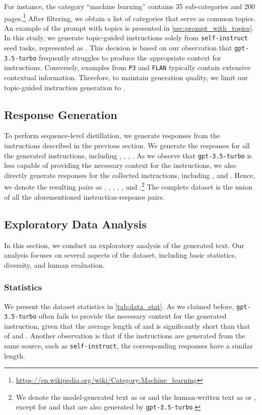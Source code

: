 \documentclass[11pt]{article}
\newcommand{\dataset}[1]{\texttt{#1}\xspace}
\newcommand{\llm}[1]{\texttt{#1}\xspace}
\newcommand{\chatgpt}{\llm{gpt-3.5-turbo}}
\begin{document}
For instance, the category ``machine learning'' contains 35 sub-categories and 200 pages.\footnote{\url{https://en.wikipedia.org/wiki/Category:Machine_learning}}
After filtering, we obtain a list of  categories that serve as common topics. 
An example of the prompt with topics is presented in \autoref{sec:prompt_with_topics}.
In this study, we generate topic-guided instructions solely from \dataset{self-instruct} seed tasks, represented as . 
This decision is based on our observation that \chatgpt frequently struggles to produce the appropriate context for instructions. 
Conversely, examples from \dataset{P3} and \dataset{FLAN} typically contain extensive contextual information. 
Therefore, to maintain generation quality, we limit our topic-guided instruction generation to .


\subsection{Response Generation}
\label{sec:response_generation}


To perform sequence-level distillation, we generate responses from the instructions described in the previous section. We generate the responses for all the generated instructions, including , , , .
As we observe that \chatgpt is less capable of providing the necessary context for the instructions, we also directly generate responses for the collected instructions, including ,  and . 
Hence, we denote the resulting pairs as , , , , ,  and .\footnote{We denote the model-generated text as  or  and the human-written text as  or , except for  and  that are also generated by \chatgpt.}
The complete dataset  is the union of all the aforementioned instruction-response pairs.







\subsection{Exploratory Data Analysis}
In this section, we conduct an exploratory analysis of the generated text. Our analysis focuses on several aspects of the dataset, including basic statistics, diversity, and human evaluation.

\subsubsection{Statistics}
We present the dataset statistics in \autoref{tab:data_stat}.
As we claimed before, \chatgpt often fails to provide the necessary context for the generated instruction, given that the average length of  and  is significantly short than that of  and .
Another observation is that if the instructions are generated from the same source, such as \dataset{self-instruct}, the corresponding responses have a similar length.
\end{document}
